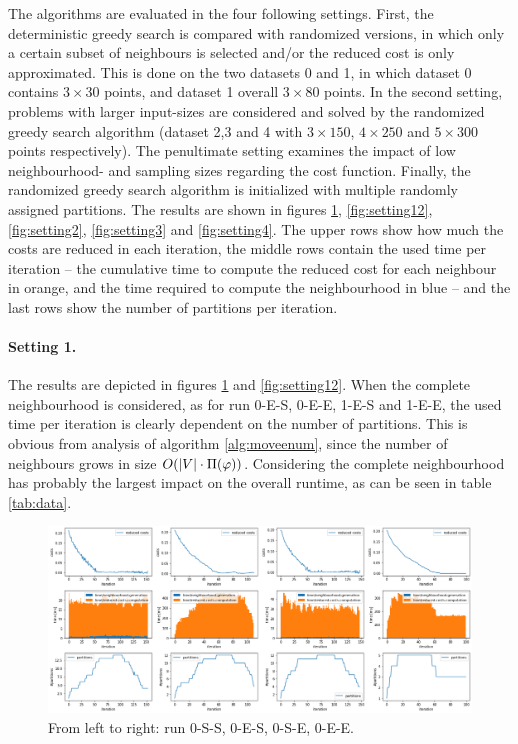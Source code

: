 The algorithms are evaluated in the four following settings. First, the deterministic greedy search is compared with randomized versions, in which only a certain subset of neighbours is selected and/or the reduced cost is only approximated. This is done on the two datasets 0 and 1, in which dataset 0 contains $3 \times 30$ points, and dataset 1 overall $3 \times 80$ points. In the second setting, problems with larger input-sizes are considered and solved by the randomized greedy search algorithm (dataset 2,3 and 4 with $3 \times 150$, $4 \times 250$ and $5 \times 300$ points respectively). The penultimate setting examines the impact of low neighbourhood- and sampling sizes regarding the cost function. Finally, the randomized greedy search algorithm is initialized with multiple randomly assigned partitions. The results are shown in figures \ref{fig:setting11}, \ref{fig:setting12}, \ref{fig:setting2}, \ref{fig:setting3} and \ref{fig:setting4}. The upper rows show how much the costs are reduced in each iteration, the middle rows contain the used time per iteration -- the cumulative time to compute the reduced cost for each neighbour in orange, and the time required to compute the neighbourhood in blue -- and the last rows show the number of partitions per iteration.

\paragraph{Setting 1.} The results are depicted in figures \ref{fig:setting11} and \ref{fig:setting12}. When the complete neighbourhood is considered, as for run 0-E-S, 0-E-E, 1-E-S and 1-E-E, the used time per iteration is clearly dependent on the number of partitions. This is obvious from analysis of algorithm \ref{alg:moveenum}, since the number of neighbours grows in size $O(|V| \cdot \Pi(\varphi))$. Considering the complete neighbourhood has probably the largest impact on the overall runtime, as can be seen in table \ref{tab:data}. 


\begin{landscape}
    \begin{figure}
        \includegraphics[width=25cm]{pics/experiments_0.png}
        \caption{From left to right: run 0-S-S, 0-E-S, 0-S-E, 0-E-E.}
        \label{fig:setting11}
    \end{figure}
\end{landscape}


